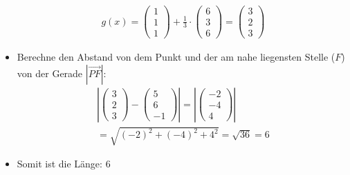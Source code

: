 \begin{itemize}
        \[
            \begin{gathered}
            g(x) = 
            \begin{pmatrix}
                1 \\ 1 \\ 1
            \end{pmatrix}
            + \frac{1}{3} \cdot
            \begin{pmatrix}
                6 \\ 3 \\ 6
            \end{pmatrix}
            = 
            \begin{pmatrix}
                3 \\ 2 \\ 3
            \end{pmatrix}
            \end{gathered}
        \]

    \item Berechne den Abstand von dem Punkt und der am nahe liegensten Stelle ($F$) von der Gerade $|\overrightarrow{PF}|$: 
        \[ 
        \begin{gathered}
            |\begin{pmatrix}
                3 \\ 2 \\ 3
            \end{pmatrix}
            -
            \begin{pmatrix}
                5 \\ 6 \\ -1
            \end{pmatrix}|
            =
            |
            \begin{pmatrix}
                -2 \\ -4 \\ 4
            \end{pmatrix}
            |
            \\
            = 
            \sqrt{(-2)^2 + (-4)^2 + 4^2} = \sqrt{36} = 6
        \end{gathered}
        \]
    \item Somit ist die Länge: $6$

\end{itemize}
